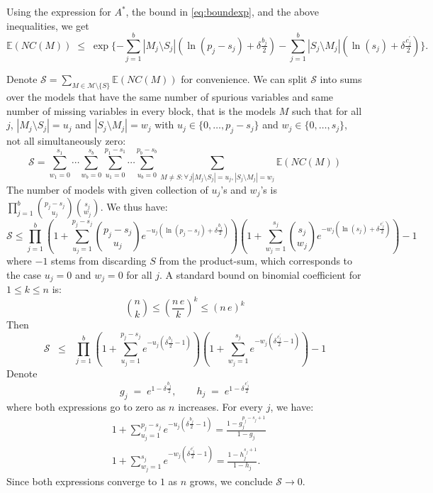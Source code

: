 \documentclass[aos]{imsart}
\theoremstyle{plain}
\newcommand{\paul}[1]{{\small{\color{green} \sf $\spadesuit$ Paul: #1}}}
\newcommand{\E}{\mathbb{E}}
\begin{document}
\begin{supplement}
Using the expression for $A^*$, the bound in \eqref{eq:boundexp}, and the above inequalities, we get
$$
\E(NC(M))\;\leq\;\exp\{- \sum_{j=1}^b |M_j\setminus S_j|(\ln(p_j-s_j)+\delta \tfrac{b_j}{2})-\sum_{j=1}^b |S_j\setminus M_j|(\ln(s_j)+\delta \tfrac{c^{\prime}_j}{2})\}.
$$





Denote $\mathcal{S}= \sum_{M \in \mathcal{M}\setminus \{S\}} \E\left(NC(M)\right)$ for convenience. We can split $\mathcal{S}$ into sums over the models that have the same number of spurious variables and same number of missing variables in every block, that is the models $M$ such that for all $j$, $|M_j\setminus S_j|=u_j$ and $|S_j\setminus M_j|=w_j$ with $u_j \in \{0,\ldots,p_j-s_j\}$ and $w_j \in \{0,\ldots,s_j\}$, not all simultaneously zero:
$$\mathcal{S} =\sum_{w_1=0}^{s_1}\cdots\sum_{w_b=0}^{s_b}\sum_{u_1=0}^{p_1-s_1}\cdots\sum_{u_b=0}^{p_b-s_b}\sum_{M \neq S:\forall \,j |M_j\setminus S_j|=u_j, |S_j\setminus M_j|=w_j } \E\left(NC(M)\right)$$
The number of models with given collection of $u_j$'s and $w_j$'s is $\prod_{j=1}^b {p_j-s_j \choose u_j}{s_j \choose w_j}$. We thus have:
\begin{equation*}
    \mathcal{S} \leq \prod_{j=1}^b\left(1+\sum_{u_j=1}^{p_j-s_j}{p_j-s_j \choose u_j}e^{- u_j(\ln(p_j-s_j)+\delta \tfrac{b_j}{2})}\right)\left(1+
    \sum_{w_j=1}^{s_j}{s_j \choose w_j}
    e^{-w_j(\ln(s_j)+\delta \tfrac{c^{\prime}_j}{2})}\right) - 1
\end{equation*}
where $-1$ stems from discarding $S$ from the product-sum, which corresponds to the case $u_j=0$ and $w_j=0$ for all $j$. A standard bound on binomial coefficient for $1\leq k\leq n$ is:
\begin{equation*}
    {n \choose k} \leq \left(\frac{n\,e}{k}\right)^k \leq \left(n\,e\right)^k
\end{equation*}
Then
\begin{equation*}
    \mathcal{S} \;\;\leq\;\; \prod_{j=1}^b\left(1+\sum_{u_j=1}^{p_j-s_j}e^{-u_j\left(\delta \tfrac{b_j}{2}-1\right)}\right)\left(1+
    \sum_{w_j=1}^{s_j}    e^{-w_j\left(\delta \tfrac{c^{\prime}_j}{2}-1\right)}\right) - 1
\end{equation*}
Denote
$$
g_j\;=\;e^{1-\delta \tfrac{b_j}{2}},\qquad h_j\;=\;e^{1-\delta \tfrac{c^{\prime}_j}{2}}
$$
where both expressions go to zero as $n$ increases.
For every $j$, we have:
\begin{align*}
    &1+\sum_{u_j=1}^{p_j-s_j}e^{-u_j\left(\delta \tfrac{b_j}{2}-1\right)}
    =\frac{1-g_j^{p_j-s_j+1}}{1-g_j} \\
    &1+\sum_{w_j=1}^{s_j}    e^{-w_j\left(\delta \tfrac{c^{\prime}_j}{2}-1\right)} =\frac{1-h_j^{s_j+1}}{1-h_j}.
\end{align*}
Since both expressions converge to $1$ as $n$ grows, we conclude $\mathcal S\to 0$.


\end{supplement}
\end{document}
